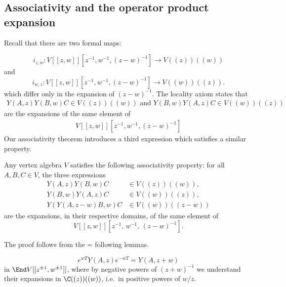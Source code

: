 \documentclass[12pt]{article}
\begin{document}
\subsection{Associativity and the operator product expansion}
Recall that there are two formal maps:

\[i_{z,w} : V[[z,w]][z^{-1},w^{-1},(z-w)^{-1}] \longrightarrow V((z))((w))\]
and
\[
    i_{w,z} : V[[z,w]][z^{-1},w^{-1},(z-w)^{-1}] \longrightarrow V((w))((z)).
\]
which differ only in the expansion of $(z-w)^{-1}$. The locality axiom states that \begin{align*}
    Y(A,z)Y(B,w)C \in V((z))((w)) \text{ and } Y(B,w)Y(A,z)C \in V((w))((z))
\end{align*} are the expansions of the same element of \begin{align*}
    V[[z,w]][z^{-1},w^{-1},(z-w)^{-1}]
\end{align*} Our associativity theorem introduces a third expression which satisfies a similar property.

\begin{theorem}[Associativity]
    Any vertex algebra $V$ satisfies the following associativity property:
    for all $A,B,C \in V$, the three expressions
    \begin{align*}
        Y(A,z)Y(B,w)C   & \in V((z))((w)),  \\[4pt]
        Y(B,w)Y(A,z)C   & \in V((w))((z)),  \\[4pt]
        Y(Y(A,z-w)B,w)C & \in V((w))((z-w))
    \end{align*}
    are the expansions, in their respective domains, of the same element of
    \[
        V[[z,w]][z^{-1},\,w^{-1},\,(z-w)^{-1}].
    \]
\end{theorem}
The proof follows from the = following lemmas.
\begin{lemma}
    \label{lemma:translation}
    \[
        e^{wT} Y(A,z) e^{-wT} = Y(A,z+w)
    \]
    in $\End V[[z^{\pm1}, w^{\pm1}]]$, where by negative powers of $(z+w)^{-1}$ we understand their
    expansions in $\C((z))((w))$, i.e.\ in positive powers of $w/z$.
\end{lemma}
\end{document}
